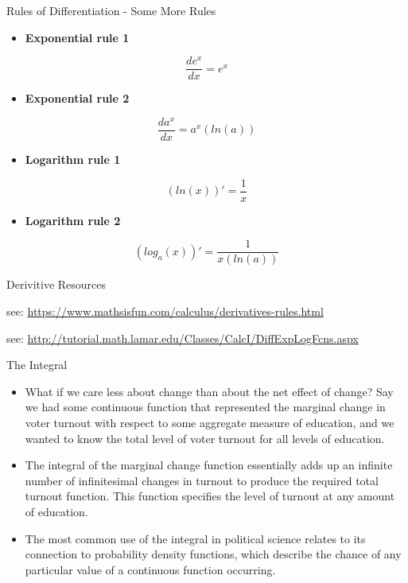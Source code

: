 \documentclass[
  ignorenonframetext,
]{beamer}
\providecommand{\tightlist}{%
  \setlength{\itemsep}{0pt}\setlength{\parskip}{0pt}}
\begin{document}
\begin{frame}{Rules of Differentiation - Some More Rules}
\protect\hypertarget{rules-of-differentiation---some-more-rules}{}

\begin{itemize}
\tightlist
\item
  \textbf{Exponential rule 1}
\end{itemize}

\[ \frac{de^{x}}{dx}= e^{x}\]

\begin{itemize}
\tightlist
\item
  \textbf{Exponential rule 2}
\end{itemize}

\[ \frac{da^{x}}{dx}= a^{x}(ln(a))\]

\begin{itemize}
\tightlist
\item
  \textbf{Logarithm rule 1}
\end{itemize}

\[ (ln(x))'= \frac{1}{x}\]

\begin{itemize}
\tightlist
\item
  \textbf{Logarithm rule 2}
\end{itemize}

\[ (log_{a}(x))'= \frac{1}{x(ln(a))}\]

\end{frame}

\begin{frame}{Derivitive Resources}
\protect\hypertarget{derivitive-resources}{}

see: \url{https://www.mathsisfun.com/calculus/derivatives-rules.html}

see:
\url{http://tutorial.math.lamar.edu/Classes/CalcI/DiffExpLogFcns.aspx}

\end{frame}

\begin{frame}{The Integral}
\protect\hypertarget{the-integral}{}

\begin{itemize}
\item
  What if we care less about change than about the net effect of change?
  Say we had some continuous function that represented the marginal
  change in voter turnout with respect to some aggregate measure of
  education, and we wanted to know the total level of voter turnout for
  all levels of education.
\item
  The integral of the marginal change function essentially adds up an
  infinite number of infinitesimal changes in turnout to produce the
  required total turnout function. This function specifies the level of
  turnout at any amount of education.
\item
  The most common use of the integral in political science relates to
  its connection to probability density functions, which describe the
  chance of any particular value of a continuous function occurring.
\end{itemize}

\end{frame}
\end{document}
